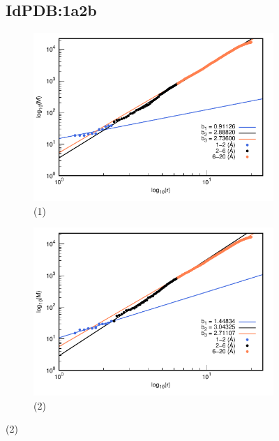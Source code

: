	\begin{figure}[H]
	\subsection*{IdPDB:1a2b}	
	\hspace{-0.3cm} 
	\begin{subfigure}{0.49\textwidth}
		\centering
		\includegraphics[width=\linewidth,page=1]{graphs/PDBs/1a2b/1a2baddH.pdf}
		\caption{(1)}
	\end{subfigure}
	\hspace{0.2cm}
	\begin{subfigure}{0.49\textwidth}
		\centering
		\includegraphics[width=\linewidth,page=1]{graphs/PDBs/1a2b/1a2bEm.pdf}
		\caption{(2)}
	\end{subfigure}
	

\end{figure}
